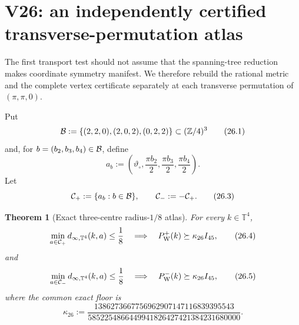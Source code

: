 \documentclass[11pt,oneside]{article}
\newtheorem{theorem}{Theorem}[section]
\theoremstyle{definition}
\theoremstyle{remark}
\begin{document}
\section{V26: an independently certified transverse-permutation atlas}
\label{sec:newv26-permutation-atlas}

The first transport test should not assume that the spanning-tree
reduction makes coordinate symmetry manifest.  We therefore rebuild
the rational metric and the complete vertex certificate separately
at each transverse permutation of \((\pi,\pi,0)\).

Put
\[
 {\cal B}:=\{(2,2,0),(2,0,2),(0,2,2)\}\subset(\mathbb Z/4)^3
                                                               \tag{26.1}
\]
and, for \(b=(b_2,b_3,b_4)\in{\cal B}\), define
\[
 a_b:=
 \left(\vartheta_\circ,\frac{\pi b_2}{2},
       \frac{\pi b_3}{2},\frac{\pi b_4}{2}\right).       \tag{26.2}
\]
Let
\[
 {\cal C}_+:=\{a_b:b\in{\cal B}\},\qquad
 {\cal C}_-:=-{\cal C}_+.                               \tag{26.3}
\]

\begin{theorem}[Exact three-centre radius-\(1/8\) atlas]
\label{thm:newv26-atlas}
For every \(k\in\mathbb T^4\),
\[
 \min_{a\in{\cal C}_+}d_{\infty,\mathbb T^4}(k,a)
 \le\frac18
 \quad\Longrightarrow\quad
 P_{\mathrm W}^+(k)\succeq\kappa_{26}I_{45},            \tag{26.4}
\]
and
\[
 \min_{a\in{\cal C}_-}d_{\infty,\mathbb T^4}(k,a)
 \le\frac18
 \quad\Longrightarrow\quad
 P_{\mathrm W}^-(k)\succeq\kappa_{26}I_{45},            \tag{26.5}
\]
where the common exact floor is
\[
 \kappa_{26}:=
 \frac{
1386273667756962907147116839395543}
{5852254866449941826427421384231680000}.                \tag{26.6}
\]
\end{theorem}
\end{document}
